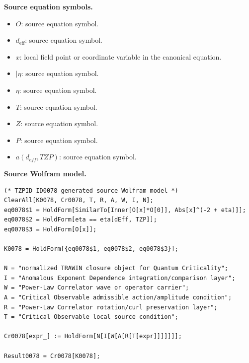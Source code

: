 \begin{minipage}[t]{0.49\linewidth}
\begingroup
\small
\raggedright
\textbf{Source equation symbols.}\par
\begin{itemize}[leftmargin=1.35em,itemsep=1pt,topsep=1pt,parsep=0pt]
    \item $O$: source equation symbol.
    \item $d_{\mathrm{eff}}$: source equation symbol.
    \item $x$: local field point or coordinate variable in the canonical equation.
    \item $\rvert\eta$: source equation symbol.
    \item $\eta$: source equation symbol.
    \item $T$: source equation symbol.
    \item $Z$: source equation symbol.
    \item $P$: source equation symbol.
    \item $a(d_{eff},TZP)$: source equation symbol.
\end{itemize}
\endgroup
\end{minipage}\hfill
\begin{minipage}[t]{0.47\linewidth}
\begingroup
\scriptsize
\raggedright
\textbf{Source Wolfram model.}\par
\begin{Verbatim}[fontsize=\tiny,breaklines=true,breakanywhere=true]
(* TZPID ID0078 generated source Wolfram model *)
ClearAll[K0078, Cr0078, T, R, A, W, I, N];
eq0078$1 = HoldForm[SimilarTo[Inner[O[x]*O[0]], Abs[x]^(-2 + eta)]];
eq0078$2 = HoldForm[eta == eta[dEff, TZP]];
eq0078$3 = HoldForm[O[x]];

K0078 = HoldForm[{eq0078$1, eq0078$2, eq0078$3}];

N = "normalized TRAWIN closure object for Quantum Criticality";
I = "Anomalous Exponent Dependence integration/comparison layer";
W = "Power-Law Correlator wave or operator carrier";
A = "Critical Observable admissible action/amplitude condition";
R = "Power-Law Correlator rotation/curl preservation layer";
T = "Critical Observable local source condition";

Cr0078[expr_] := HoldForm[N[I[W[A[R[T[expr]]]]]]];

Result0078 = Cr0078[K0078];
\end{Verbatim}
\endgroup
\end{minipage}

